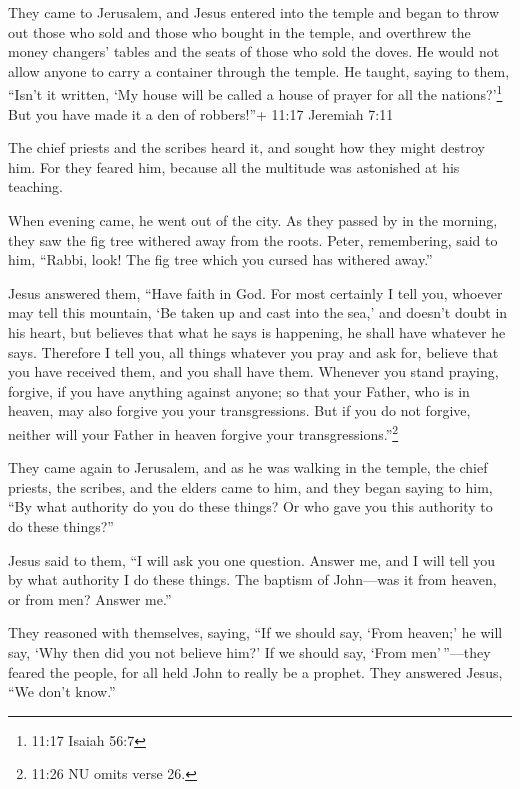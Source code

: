  They came to Jerusalem, and Jesus entered into the temple
and began to throw out those who sold and those who bought in the
temple, and overthrew the money changers' tables and the seats of those
who sold the doves.  He would not allow anyone to carry a
container through the temple.  He taught, saying to them,
``Isn't it written, `My house will be called a house of prayer for all
the nations?'\footnote{11:17 Isaiah 56:7} But you have made it a den of
robbers!''+ 11:17 Jeremiah 7:11

 The chief priests and the scribes heard it, and sought how
they might destroy him. For they feared him, because all the multitude
was astonished at his teaching.

 When evening came, he went out of the city. 
As they passed by in the morning, they saw the fig tree withered away
from the roots.  Peter, remembering, said to him, ``Rabbi,
look! The fig tree which you cursed has withered away.''

 Jesus answered them, ``Have faith in God. 
For most certainly I tell you, whoever may tell this mountain, `Be taken
up and cast into the sea,' and doesn't doubt in his heart, but believes
that what he says is happening, he shall have whatever he says.
 Therefore I tell you, all things whatever you pray and ask
for, believe that you have received them, and you shall have them.
 Whenever you stand praying, forgive, if you have anything
against anyone; so that your Father, who is in heaven, may also forgive
you your transgressions.  But if you do not forgive,
neither will your Father in heaven forgive your
transgressions.''\footnote{11:26 NU omits verse 26.}

 They came again to Jerusalem, and as he was walking in the
temple, the chief priests, the scribes, and the elders came to him,
 and they began saying to him, ``By what authority do you
do these things? Or who gave you this authority to do these things?''

 Jesus said to them, ``I will ask you one question. Answer
me, and I will tell you by what authority I do these things.
 The baptism of John---was it from heaven, or from men?
Answer me.''

 They reasoned with themselves, saying, ``If we should say,
`From heaven;' he will say, `Why then did you not believe him?'
 If we should say, `From men'\,''---they feared the people,
for all held John to really be a prophet.  They answered
Jesus, ``We don't know.''

